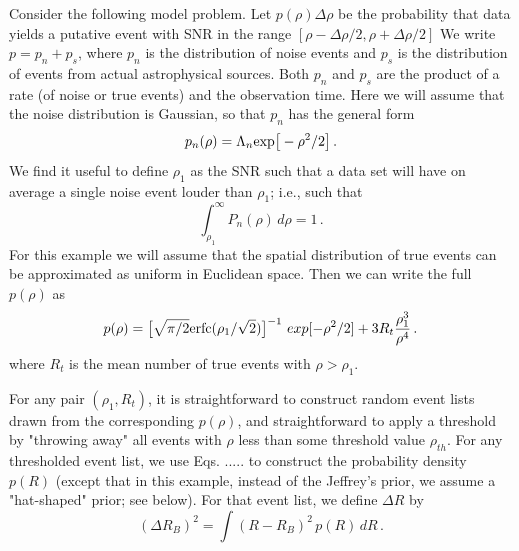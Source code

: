 \documentclass[aps,prd]{revtex4-1}
\newcommand{\be}{\begin{equation}}
\newcommand{\ee}{\end{equation}}
\begin{document}
Consider the following model problem.
Let $p(\rho)\Delta\rho$ be the probability that data yields a putative event with SNR in the
range $[\rho - \Delta\rho/2, \rho + \Delta\rho/2]$  We write $p = p_n + p_s$, where $p_n$ is
the distribution of noise events and $p_s$ is the distribution of events from actual astrophysical sources.   Both $p_n$ and $p_s$ are the product of a rate (of noise or true events) and the observation time.  Here we will assume that the noise distribution is Gaussian, so that $p_n$
has the general form
\be 
p_n(\rho) = \Lambda_n {\rm exp}\big[-\rho^2/2\big] \, .
\ee
\noindent
We find it useful to define $\rho_1$ as the SNR such that a data set will have on average
a single noise event louder than $\rho_1$; i.e., such that
\be
\int_{\rho_1}^{\infty} P_n(\rho)\, d\rho  = 1 \, .
\ee
For this example we will assume that the spatial distribution of true events can be approximated as uniform in Euclidean space. Then we can write the full $p(\rho)$ as
\be\label{eq:ptot}
p(\rho) = \big[\sqrt{\pi/2} {\rm erfc}(\rho_1/\sqrt{2})\big]^{-1} \ exp[-\rho^2/2] + 3 R_t \frac{\rho_1^3}{\rho^4} \, .
\ee
\noindent where $R_t$ is the mean number of true events with $\rho > \rho_1$.

For any pair $(\rho_1, R_t)$, it is straightforward to construct random event lists drawn from the corresponding $p(\rho)$, and straightforward to apply a threshold by "throwing away" all events with $\rho$ less than some threshold value $\rho_{th}$.  For any thresholded event list, we use
Eqs. ..... to construct the probability density $p(R)$ (except that in this example, instead of the
Jeffrey's prior, we assume a "hat-shaped" prior; see below).
For that event list, we define $\Delta R$ by
\be
(\Delta R_B)^2 = \int{(R - R_B)^2 \, p(R)\, dR }\, .
\ee
\end{document}

